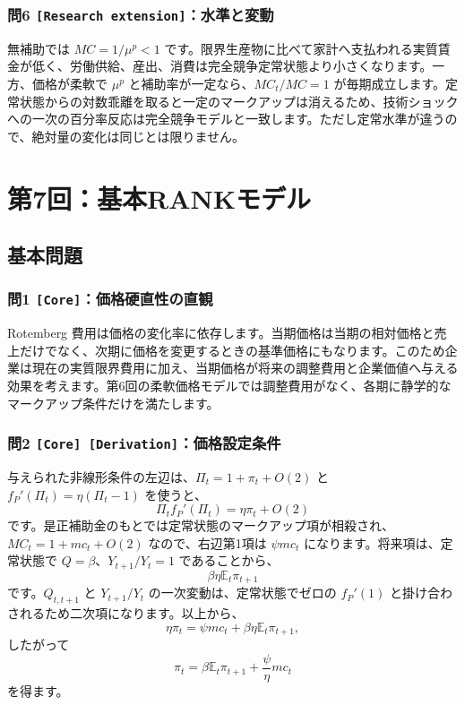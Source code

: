 \documentclass[
  japanese,
  lualatex,
  ja=standard,
  11pt,
  a4paper]{ltjsarticle}
\begin{document}
\subsubsection{\texorpdfstring{問6
\texttt{{[}Research\ extension{]}}：水準と変動}{問6 {[}Research extension{]}：水準と変動}}\label{ux554f6-research-extensionux6c34ux6e96ux3068ux5909ux52d5}

無補助では \(MC=1/\mu^p<1\)
です。限界生産物に比べて家計へ支払われる実質賃金が低く、労働供給、産出、消費は完全競争定常状態より小さくなります。一方、価格が柔軟で
\(\mu^p\) と補助率が一定なら、\(MC_t/MC=1\)
が毎期成立します。定常状態からの対数乖離を取ると一定のマークアップは消えるため、技術ショックへの一次の百分率反応は完全競争モデルと一致します。ただし定常水準が違うので、絶対量の変化は同じとは限りません。

\clearpage

\section{第7回：基本RANKモデル}\label{ux7b2c7ux56deux57faux672crankux30e2ux30c7ux30eb}

\subsection{基本問題}\label{ux57faux672cux554fux984c-6}

\subsubsection{\texorpdfstring{問1
\texttt{{[}Core{]}}：価格硬直性の直観}{問1 {[}Core{]}：価格硬直性の直観}}\label{ux554f1-coreux4fa1ux683cux786cux76f4ux6027ux306eux76f4ux89b3}

Rotemberg
費用は価格の変化率に依存します。当期価格は当期の相対価格と売上だけでなく、次期に価格を変更するときの基準価格にもなります。このため企業は現在の実質限界費用に加え、当期価格が将来の調整費用と企業価値へ与える効果を考えます。第6回の柔軟価格モデルでは調整費用がなく、各期に静学的なマークアップ条件だけを満たします。

\subsubsection{\texorpdfstring{問2
\texttt{{[}Core{]}\ {[}Derivation{]}}：価格設定条件}{問2 {[}Core{]} {[}Derivation{]}：価格設定条件}}\label{ux554f2-core-derivationux4fa1ux683cux8a2dux5b9aux6761ux4ef6}

与えられた非線形条件の左辺は、\(\Pi_t=1+\pi_t+O(2)\) と
\(f_P'(\Pi_t)=\eta(\Pi_t-1)\) を使うと、 \[
\Pi_tf_P'(\Pi_t)=\eta\pi_t+O(2)
\]
です。是正補助金のもとでは定常状態のマークアップ項が相殺され、\(MC_t=1+mc_t+O(2)\)
なので、右辺第1項は \(\psi mc_t\) になります。将来項は、定常状態で
\(Q=\beta\)、\(Y_{t+1}/Y_t=1\) であることから、 \[
\beta\eta\mathbb E_t\pi_{t+1}
\] です。\(Q_{t,t+1}\) と \(Y_{t+1}/Y_t\) の一次変動は、定常状態でゼロの
\(f_P'(1)\) と掛け合わされるため二次項になります。以上から、 \[
\eta\pi_t
=\psi mc_t+\beta\eta\mathbb E_t\pi_{t+1},
\] したがって \[
\pi_t=\beta\mathbb E_t\pi_{t+1}+\frac{\psi}{\eta}mc_t
\] を得ます。
\end{document}
